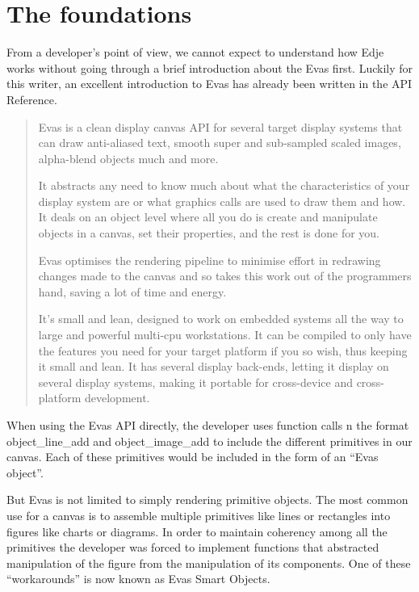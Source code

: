 \documentclass[12pt,a4paper,english]{book}
\begin{document}

\hypertarget{the-foundations}{}
\section{The foundations}
\label{the-foundations}

From a developer's point of view, we cannot expect to understand how Edje works
without going through a brief introduction about the Evas first. Luckily for
this writer, an excellent introduction to Evas has already been written in the
API Reference.
\begin{quote}

Evas is a clean display canvas API for several target display systems that
can draw anti-aliased text, smooth super and sub-sampled scaled images,
alpha-blend objects much and more.

It abstracts any need to know much about what the characteristics of your
display system are or what graphics calls are used to draw them and how. It
deals on an object level where all you do is create and manipulate objects
in a canvas, set their properties, and the rest is done for you.

Evas optimises the rendering pipeline to minimise effort in redrawing
changes made to the canvas and so takes this work out of the programmers
hand, saving a lot of time and energy.

It's small and lean, designed to work on embedded systems all the way to
large and powerful multi-cpu workstations. It can be compiled to only have
the features you need for your target platform if you so wish, thus keeping
it small and lean. It has several display back-ends, letting it display on
several display systems, making it portable for cross-device and
cross-platform development.
\end{quote}

When using the Evas API directly, the developer uses function calls n the format
object{\_}line{\_}add and object{\_}image{\_}add to include the different primitives in our
canvas. Each of these primitives would be included in the form of an ``Evas
object''.

But Evas is not limited to simply rendering primitive objects. The most common
use for a canvas is to assemble multiple primitives like lines or rectangles
into figures like charts or diagrams. In order to maintain coherency among all
the primitives the developer was forced to implement functions that abstracted
manipulation of the figure from the manipulation of its components. One of
these ``workarounds'' is now known as Evas Smart Objects.
\end{document}
